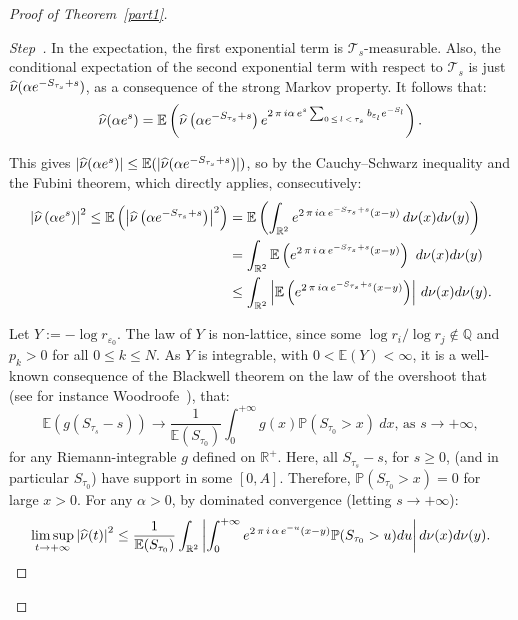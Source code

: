\documentclass[10pt]{amsart}
\theoremstyle{definition}\newtheorem{defi}[theo]{Definition}\newtheorem{rema}[theo]{Remark}\newtheorem{exam}[theo]{Example}\newtheorem{exem}[theo]{Example}\newtheorem{nota}[theo]{Notation}
\newcommand{\Pbb}{\mathbb P}
\newcommand{\Ebb}{\mathbb E}
\newcommand{\Rbb}{\mathbb R}
\newcommand{\Qbb}{\mathbb Q}
\newcommand{\Tcl}{\mathcal{T}}
\newcounter{stepcount}
\newenvironment{step}{\refstepcounter{stepcount}\begin{proof}[Step~\thestepcount]}{\let\qed\relax\end{proof}}
\let\oldhat\hat
\renewcommand*{\hat}[1]{\mathchoice{\widehat{#1}}{\widehat{#1}}{\oldhat{#1}}{\oldhat{#1}}}
\begin{document}
\begin{proof}[{Proof of Theorem~\ref{part1}}]
\begin{step}
In the expectation, the first exponential term is ${\Tcl}_s$-measurable. Also, the conditional expectation of the second exponential term with respect to ${\Tcl}_s$ is just $\hat{\nu}(\alpha e^{-S_{\tau_s}+s})$, as a consequence of the strong Markov property. It follows that:
\[
\hat{\nu}(\alpha e^s)=\Ebb\left({\hat{\nu}\left(\alpha e^{-S_{\tau_s}+s}\right)e^{2\,\pi\,i\alpha\,e^{s}\sum_{0\,\leq\,l\,<\,\tau_s}b_{\varepsilon_l}e^{-S_l}}}\right).
\]


This gives $|\hat{\nu}(\alpha e^s)|\leq\Ebb({|\hat{\nu}(\alpha e^{-S_{\tau_s}+s})|})$, so by the Cauchy--Schwarz inequality and the Fubini theorem, which directly applies, consecutively:
\begin{align*}
\left|\hat{\nu}\left(\alpha e^s\right)\right|^2\leq\Ebb\left(\left|\hat{\nu}\left(\alpha e^{-S_{\tau_s}+s}\right)\right|^2\right)&=\Ebb\left(\int_{\Rbb^2}e^{2\,\pi\,i\alpha\,e^{-S_{\tau_s}+s}(x-y)}\,d\nu(x)d\nu(y)\right)\\
&=\int_{\Rbb^2}\Ebb\left(e^{2\,\pi\,i\,\alpha\,e^{-S_{\tau_s}+s}(x-y)}\right)~d\nu(x)d\nu(y)\\
&\leq\int_{\Rbb^2}\left|\Ebb\left({e^{2\,\pi\,i\alpha\,e^{-S_{\tau_s}+s}(x-y)}}\right)\right|\,d\nu(x)d\nu(y).
\end{align*}



Let $Y:=-\log r_{\varepsilon_0}$. The law of $Y$ is non-lattice, since some $\log r_i/\log r_j\not\in\Qbb$ and $p_k>0$ for all $0\leq k\leq N$. As $Y$ is integrable, with $0<\Ebb(Y)<\infty$, it is a well-known consequence of the Blackwell theorem on the law of the overshoot that (see for instance Woodroofe~\cite[Chapter~2, Theorem~2.3]{wood}), that:
\[
\Ebb\left(g(S_{\tau_s}-s)\right)\rightarrow \frac{1}{\Ebb(S_{\tau_0})}\int_0^{+\infty}g(x)\Pbb(S_{\tau_0}>x)~dx\text{, as }s\rightarrow+\infty,
\]
for any Riemann-integrable $g$ defined on $\Rbb^+$. Here, all $S_{\tau_s}-s$, for $s\geq0$, (and in particular $S_{\tau_0}$) have support in some $[0,A]$. Therefore, $\Pbb(S_{\tau_0}>x)=0$ for large $x>0$. For any $\alpha>0$, by dominated convergence (letting $s\rightarrow+\infty$):
\[
\limsup_{t\rightarrow+\infty}\left|\hat{\nu}(t)\right|^2\leq \frac{1}{\Ebb(S_{\tau_0})}\int_{\Rbb^2}\left|{\int_{0}^{+\infty}e^{2\,\pi\,i\,\alpha\,e^{-u}(x-y)}\Pbb(S_{\tau_0}>u)du}\right|d\nu(x)d\nu(y).
\]



\end{step}
\end{proof}
\end{document}

